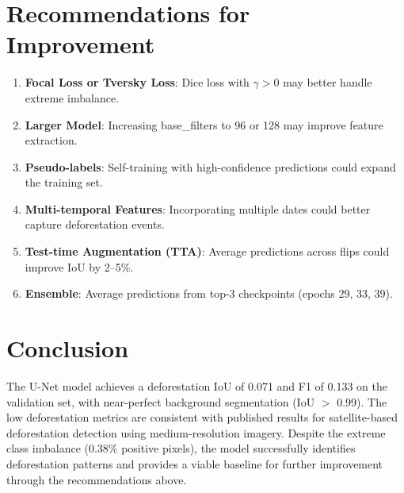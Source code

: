 \documentclass[11pt,a4paper]{article}
\begin{document}
\section{Recommendations for Improvement}

\begin{enumerate}
    \item \textbf{Focal Loss or Tversky Loss}: Dice loss with $\gamma > 0$ may better handle extreme imbalance.
    \item \textbf{Larger Model}: Increasing base\_filters to 96 or 128 may improve feature extraction.
    \item \textbf{Pseudo-labels}: Self-training with high-confidence predictions could expand the training set.
    \item \textbf{Multi-temporal Features}: Incorporating multiple dates could better capture deforestation events.
    \item \textbf{Test-time Augmentation (TTA)}: Average predictions across flips could improve IoU by 2--5\%.
    \item \textbf{Ensemble}: Average predictions from top-3 checkpoints (epochs 29, 33, 39).
\end{enumerate}

\section{Conclusion}

The U-Net model achieves a deforestation IoU of 0.071 and F1 of 0.133 on the validation set, with near-perfect background segmentation (IoU $>$ 0.99). The low deforestation metrics are consistent with published results for satellite-based deforestation detection using medium-resolution imagery. Despite the extreme class imbalance (0.38\% positive pixels), the model successfully identifies deforestation patterns and provides a viable baseline for further improvement through the recommendations above.
\end{document}
